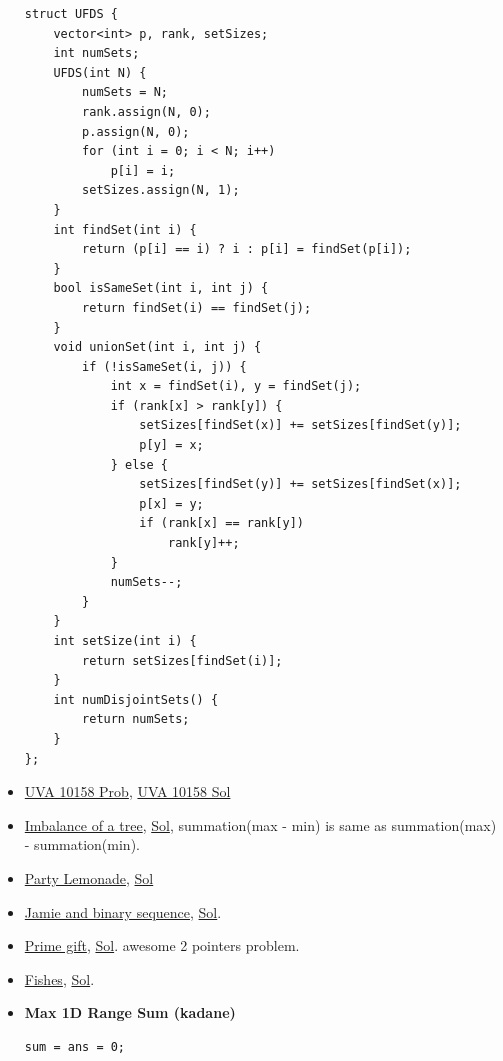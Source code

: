 \documentclass[8pt, a4paper, oneside, twocolumn]{extarticle}
\begin{document}
\begin{itemize}
    \begin{verbatim}
struct UFDS {
    vector<int> p, rank, setSizes;
    int numSets;
    UFDS(int N) {
        numSets = N;
        rank.assign(N, 0);
        p.assign(N, 0);
        for (int i = 0; i < N; i++)
            p[i] = i;
        setSizes.assign(N, 1);
    }
    int findSet(int i) {
        return (p[i] == i) ? i : p[i] = findSet(p[i]);
    }
    bool isSameSet(int i, int j) {
        return findSet(i) == findSet(j);
    }
    void unionSet(int i, int j) {
        if (!isSameSet(i, j)) {
            int x = findSet(i), y = findSet(j);
            if (rank[x] > rank[y]) {
                setSizes[findSet(x)] += setSizes[findSet(y)];
                p[y] = x;
            } else {
                setSizes[findSet(y)] += setSizes[findSet(x)];
                p[x] = y;
                if (rank[x] == rank[y])
                    rank[y]++;
            }
            numSets--;
        }
    }
    int setSize(int i) {
        return setSizes[findSet(i)];
    }
    int numDisjointSets() {
        return numSets;
    }
};
    \end{verbatim}
    \item \href {https://uva.onlinejudge.org/external/101/10158.pdf}{UVA 10158 Prob}, \href {https://gist.github.com/sourabh2311/3a2daf2a9f77104a94d1db9af8b40b1a}{UVA 10158 Sol}
    \item \href {https://codeforces.com/contest/915/problem/F}{Imbalance of a tree}, \href {https://github.com/sourabh2311/Competitive-Programming/blob/master/CF/ER36/F.cpp}{Sol}, summation(max - min) is same as summation(max) - summation(min).
    \item \href {https://codeforces.com/contest/913/problem/C}{Party Lemonade}, \href {https://codeforces.com/contest/913/submission/34067096}{Sol}
    \item \href {https://codeforces.com/contest/916/problem/B}{Jamie and binary sequence}, \href {https://github.com/sourabh2311/Competitive-Programming/blob/master/CF/457D2/B.cpp}{Sol}.
    \item \href {https://codeforces.com/contest/912/problem/E}{Prime gift}, \href {https://codeforces.com/contest/912/submission/33976448}{Sol}. awesome 2 pointers problem.
    \item \href {https://codeforces.com/contest/912/problem/D}{Fishes}, \href {https://codeforces.com/blog/entry/56920}{Sol}. 
    \item \textbf{Max 1D Range Sum (kadane)}
    \begin{verbatim}
sum = ans = 0;

\end{verbatim}
\end{itemize}
\end{document}
